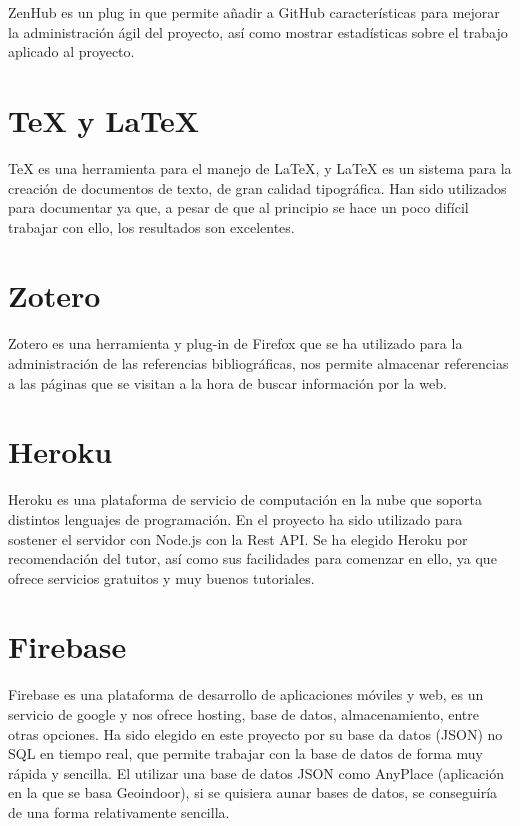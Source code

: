 ZenHub es un plug in que permite añadir a GitHub características para mejorar la administración ágil del proyecto, así como mostrar estadísticas sobre el trabajo aplicado al proyecto.



\section{\TeX{} y \LaTeX}\label{Latex}

\TeX{} es una herramienta para el manejo de \LaTeX{}, y \LaTeX{} es un sistema para la creación de documentos de texto, de gran calidad tipográfica.
Han sido utilizados para documentar ya que, a pesar de que al principio se hace un poco difícil trabajar con ello, los resultados son excelentes.

\section{Zotero}\label{zotero}

Zotero es una herramienta y plug-in de Firefox que se ha utilizado para la administración de las referencias bibliográficas, nos permite almacenar referencias a las páginas que se visitan a la hora de buscar información por la web. 

\section{Heroku}\label{heroku}

Heroku es una plataforma de servicio de computación en la nube que soporta distintos lenguajes de programación.
En el proyecto ha sido utilizado para sostener el servidor con Node.js con la Rest API. Se ha elegido Heroku por recomendación del tutor, así como sus facilidades para comenzar en ello, ya que ofrece servicios gratuitos y muy buenos tutoriales.

\section{Firebase}\label{firebase}

Firebase es una plataforma de desarrollo de aplicaciones móviles y web, es un servicio de google y nos ofrece hosting, base de datos, almacenamiento, entre otras opciones. Ha sido elegido en este proyecto por su base da datos (JSON) no SQL en tiempo real, que permite trabajar con la base de datos de forma muy rápida y sencilla. El utilizar una base de datos JSON como AnyPlace (aplicación en la que se basa Geoindoor), si se quisiera aunar bases de datos, se conseguiría de una forma relativamente sencilla.



